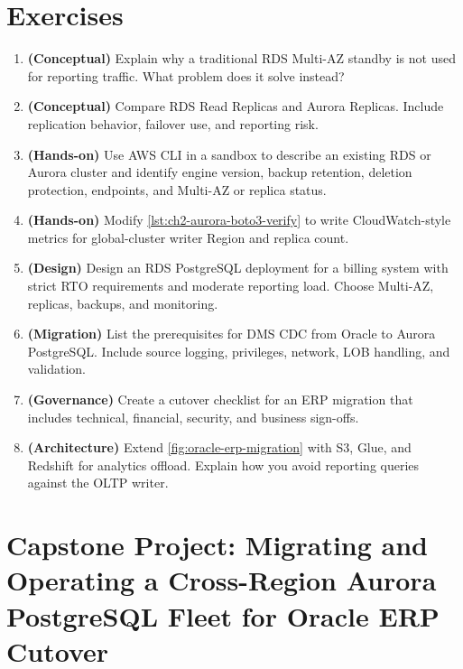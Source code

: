 \section{Exercises}
\begin{enumerate}
    \item \textbf{(Conceptual)} Explain why a traditional RDS Multi-AZ standby is not used for reporting traffic. What problem does it solve instead?
    \item \textbf{(Conceptual)} Compare RDS Read Replicas and Aurora Replicas. Include replication behavior, failover use, and reporting risk.
    \item \textbf{(Hands-on)} Use AWS CLI in a sandbox to describe an existing RDS or Aurora cluster and identify engine version, backup retention, deletion protection, endpoints, and Multi-AZ or replica status.
    \item \textbf{(Hands-on)} Modify \cref{lst:ch2-aurora-boto3-verify} to write CloudWatch-style metrics for global-cluster writer Region and replica count.
    \item \textbf{(Design)} Design an RDS PostgreSQL deployment for a billing system with strict RTO requirements and moderate reporting load. Choose Multi-AZ, replicas, backups, and monitoring.
    \item \textbf{(Migration)} List the prerequisites for DMS CDC from Oracle to Aurora PostgreSQL. Include source logging, privileges, network, LOB handling, and validation.
    \item \textbf{(Governance)} Create a cutover checklist for an ERP migration that includes technical, financial, security, and business sign-offs.
    \item \textbf{(Architecture)} Extend \cref{fig:oracle-erp-migration} with S3, Glue, and Redshift for analytics offload. Explain how you avoid reporting queries against the OLTP writer.
\end{enumerate}

\section{Capstone Project: Migrating and Operating a Cross-Region Aurora PostgreSQL Fleet for Oracle ERP Cutover}\label{sec:ch2-capstone}

